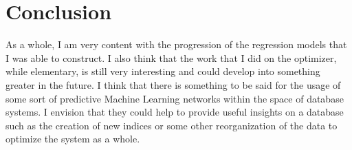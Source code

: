 \documentclass[sigconf]{acmart}
\begin{document}
\section{Conclusion}
As a whole, I am very content with the progression of the regression models that I was able to construct. I also think that the work that I did on the optimizer, while elementary, is still very interesting and could develop
into something greater in the future. I think that there is something to be said for the usage of some sort of predictive Machine Learning networks within the space of database systems. I envision that they could help to 
provide useful insights on a database such as the creation of new indices or some other reorganization of the data to optimize the system as a whole. 



\end{document}
